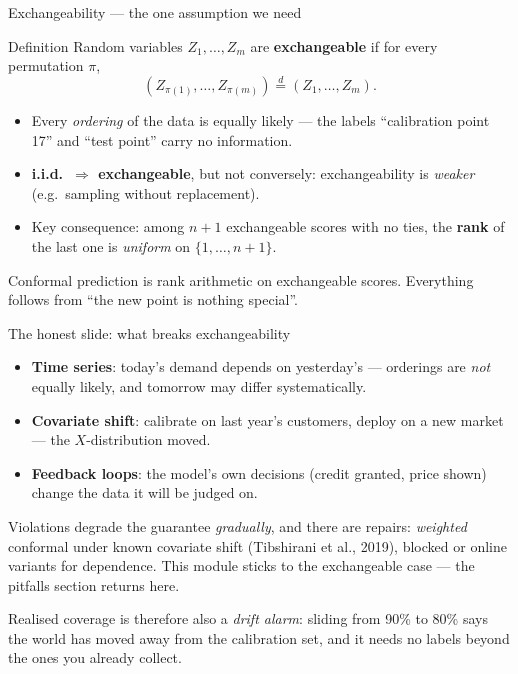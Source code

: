 \documentclass[aspectratio=169,11pt]{beamer}
\begin{document}
\begin{frame}{Exchangeability --- the one assumption we need}
  \scriptsize
  \begin{block}{Definition}
    Random variables $Z_1, \dots, Z_m$ are \textbf{exchangeable} if for every
    permutation $\pi$,
    \[
      (Z_{\pi(1)}, \dots, Z_{\pi(m)}) \overset{d}{=} (Z_1, \dots, Z_m).
    \]
  \end{block}
  \begin{readme}
    \begin{itemize}
      \item Every \emph{ordering} of the data is equally likely --- the labels
            ``calibration point 17'' and ``test point'' carry no information.
      \item \textbf{i.i.d.\ $\Rightarrow$ exchangeable}, but not conversely:
            exchangeability is \emph{weaker} (e.g.\ sampling without replacement).
      \item Key consequence: among $n + 1$ exchangeable scores with no ties, the
            \textbf{rank} of the last one is \emph{uniform} on $\{1, \dots, n+1\}$.
    \end{itemize}
  \end{readme}
  \begin{takeaway}
    Conformal prediction is rank arithmetic on exchangeable scores. Everything follows
    from ``the new point is nothing special''.
  \end{takeaway}
\end{frame}

\begin{frame}{The honest slide: what breaks exchangeability}
  \footnotesize
  \begin{itemize}
    \item \textbf{Time series}: today's demand depends on yesterday's --- orderings
          are \emph{not} equally likely, and tomorrow may differ systematically.
    \item \textbf{Covariate shift}: calibrate on last year's customers, deploy on a
          new market --- the $X$-distribution moved.
    \item \textbf{Feedback loops}: the model's own decisions (credit granted, price
          shown) change the data it will be judged on.
  \end{itemize}
  \begin{readme}
    Violations degrade the guarantee \emph{gradually}, and there are repairs:
    \emph{weighted} conformal under known covariate shift (Tibshirani et al., 2019),
    blocked or online variants for dependence. This module sticks to the exchangeable
    case --- the pitfalls section returns here.
  \end{readme}
  \begin{takeaway}
    Realised coverage is therefore also a \emph{drift alarm}: sliding from 90\% to 80\%
    says the world has moved away from the calibration set, and it needs no labels
    beyond the ones you already collect.
  \end{takeaway}
\end{frame}
\end{document}
